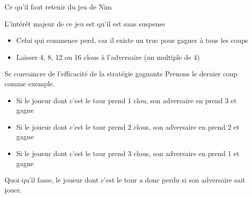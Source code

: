 \documentclass[final,hyperref={pdfpagelabels=false}]{beamer}
\begin{document}

\newcommand{\clou}[2]{\draw[#2] #1 -- +(.4,0) -- +(.2,0) -- +(.2,.5);}
\begin{frame}{Ce qu'il faut retenir du jeu de Nim}

  \begin{block}{L'intérêt majeur de ce jeu est qu'il est sans suspense}
    \begin{itemize}
    \item Celui qui commence perd, car il existe un truc pour gagner à tous
      les coups
    \item {} Laisser 4, 8, 12 ou 16 clous à
      l'adversaire (un multiple de 4)
    \end{itemize}
  \end{block}

  \begin{block}{Se convaincre de l'efficacité de la stratégie gagnante}
    Prenons le dernier coup comme exemple.
    \begin{itemize}
    \item Si le joueur dont c'est le tour prend 1 clou, son adversaire en prend
      3 et gagne
    \item Si le joueur dont c'est le tour prend 2 clous, son adversaire en
      prend 2 et gagne
    \item Si le joueur dont c'est le tour prend 3 clous, son adversaire en
      prend 1 et gagne 
    \end{itemize}
    Quoi qu'il fasse, le joueur dont c'est le tour a donc perdu si son
    adversaire sait jouer.
  \end{block}


\end{frame}
\end{document}
